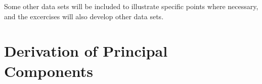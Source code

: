 Some other data sets will be included to illustrate specific points where necessary, and the excercises will also develop other data sets.



\section{Derivation of Principal Components}

